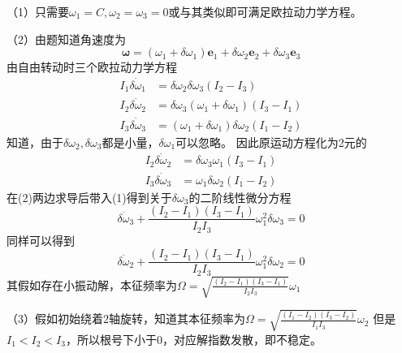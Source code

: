 \begin{solution}
    （1）只需要$\omega_1=C,\omega_2=\omega_3=0$或与其类似即可满足欧拉动力学方程。

    （2）由题知道角速度为
    $$\boldsymbol{\omega}=(\omega_1+\delta\omega_1)\textbf{e}_1+\delta\omega_2\textbf{e}_2+\delta\omega_3\textbf{e}_3$$
    由自由转动时三个欧拉动力学方程
    \begin{align*}
        I_1\dot{\delta\omega_1}&=\delta\omega_2\delta\omega_3(I_2-I_3)\\
        I_2\dot{\delta\omega_2}&=\delta\omega_3(\omega_1+\delta\omega_1)(I_3-I_1)\\
        I_3\dot{\delta\omega_3}&=(\omega_1+\delta\omega_1)\delta\omega_2(I_1-I_2)
    \end{align*}
    知道，由于$\delta\omega_2,\delta\omega_3$都是小量，$\delta\omega_1$可以忽略。
    因此原运动方程化为2元的
    \begin{align}
        I_2\dot{\delta\omega_2}&=\delta\omega_3\omega_1(I_3-I_1)\\
        I_3\dot{\delta\omega_3}&=\omega_1\delta\omega_2(I_1-I_2)
    \end{align}
    在(2)两边求导后带入(1)得到关于$\delta\omega_3$的二阶线性微分方程
    $$\ddot{\delta\omega_3}+\frac{(I_2-I_1)(I_3-I_1)}{I_2I_3}\omega_1^2\delta\omega_3=0$$
    同样可以得到
    $$\ddot{\delta\omega_2}+\frac{(I_2-I_1)(I_3-I_1)}{I_2I_3}\omega_1^2\delta\omega_2=0$$
    其假如存在小振动解，本征频率为$\Omega=\sqrt{\frac{(I_2-I_1)(I_3-I_1)}{I_2I_3}}\omega_1$

    （3）假如初始绕着$2$轴旋转，知道其本征频率为$\Omega=\sqrt{\frac{(I_1-I_2)(I_3-I_2)}{I_1I_3}}\omega_2$
    但是$I_1<I_2<I_3$，所以根号下小于$0$，对应解指数发散，即不稳定。
\end{solution}
